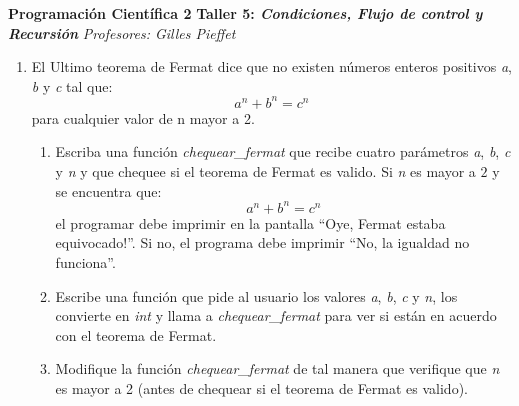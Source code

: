 \documentclass[10pt, twocolumn]{article}
\begin{document}
\noindent
{\Large \bf Programación Científica 2}
\vskip 0.3cm
\noindent
{\large \bf Taller 5: {\it Condiciones, Flujo de control y Recursión}}
\vskip 0.2cm
\noindent
{\it Profesores:  Gilles Pieffet}\\


\noindent
\begin{enumerate}
\item El Ultimo teorema de Fermat dice que no existen números enteros positivos \emph{a}, \emph{b} y \emph{c} tal que:
\[ a^n + b^n = c^n \]
para cualquier valor de n mayor a 2.
\begin{enumerate}
	\item Escriba una función \emph{chequear\_fermat} que recibe cuatro parámetros \emph{a}, \emph{b}, \emph{c} y \emph{n} y que chequee si el teorema de Fermat es valido. Si \emph{n} es mayor a $2$ y se encuentra que:
	\[ a^n + b^n = c^n \]
	el programar debe imprimir en la pantalla ``Oye, Fermat estaba equivocado!''. Si no, el programa debe imprimir ``No, la igualdad no funciona''.
	\item Escribe una función que pide al usuario los valores \emph{a}, \emph{b}, \emph{c} y \emph{n}, los convierte en \emph{int} y llama a \emph{chequear\_fermat} para ver si están en acuerdo con el teorema de Fermat.
	\item Modifique la función \emph{chequear\_fermat} de tal manera que verifique que \emph{n} es mayor a 2 (antes de chequear si el teorema de Fermat es valido).
\end{enumerate}


\end{enumerate}
\end{document}
